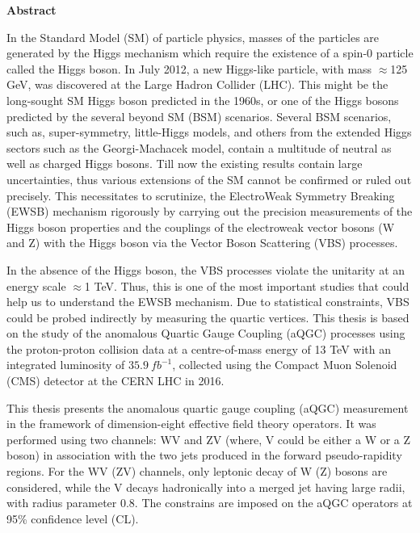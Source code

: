 \begin{center}
  \textbf{\large{Abstract}}
\end{center} 
In the Standard Model (SM) of particle physics, masses of the particles are generated by the Higgs mechanism which require the existence of a spin-0 particle called the Higgs boson. In July 2012, a new Higgs-like particle, with mass $\approx$125 GeV, was discovered at the Large Hadron Collider (LHC). This might be the long-sought SM Higgs boson predicted in the 1960s, or one of the Higgs bosons predicted by the several beyond SM (BSM) scenarios. Several BSM scenarios, such as, super-symmetry, little-Higgs models, and others from the extended Higgs sectors such as the Georgi-Machacek model, contain a multitude of neutral as well as charged Higgs bosons. Till now the existing results contain large uncertainties, thus various extensions of the SM cannot be confirmed or ruled out precisely.
This necessitates to scrutinize, the ElectroWeak Symmetry Breaking (EWSB) mechanism rigorously by carrying out the precision measurements of the Higgs boson properties and the couplings of the electroweak vector bosons (W and Z) with the Higgs boson via the Vector Boson Scattering (VBS) processes.

In the absence of the Higgs boson, the VBS processes violate the unitarity at an energy scale $\approx$1 TeV. Thus, this is one of the most important studies that could help us to understand the EWSB mechanism. Due to statistical constraints, VBS could be probed indirectly by measuring the quartic vertices. This thesis is based on the study of the anomalous Quartic Gauge Coupling (aQGC) processes using the proton-proton collision data at a centre-of-mass energy of 13 TeV with an integrated luminosity of $35.9~fb^{-1}$, collected using the Compact Muon Solenoid (CMS) detector at the CERN LHC in 2016.

This thesis presents the anomalous quartic gauge coupling (aQGC) measurement in the framework of dimension-eight effective field theory operators. It was performed using two channels: WV and ZV (where, V could be either a W or a Z boson) in association with the two jets produced in the forward pseudo-rapidity regions. For the WV (ZV) channels, only leptonic decay of W (Z) bosons are considered, while the V decays hadronically into a merged jet having large radii, with radius parameter 0.8. The constrains are imposed on the aQGC operators at 95\% confidence level (CL).

